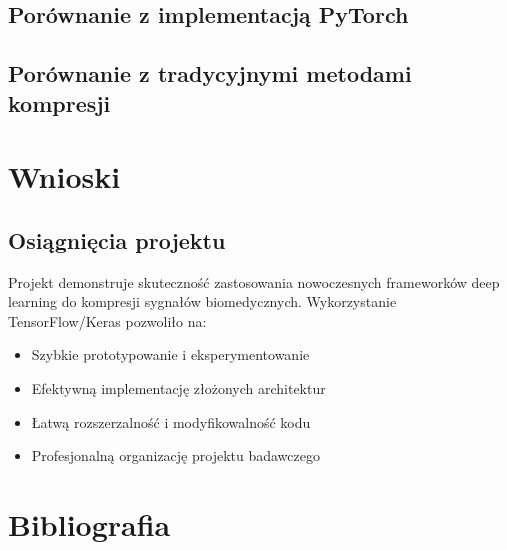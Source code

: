 \documentclass[12pt,a4paper]{article}
\begin{document}
\subsection{Porównanie z implementacją PyTorch}


\subsection{Porównanie z tradycyjnymi metodami kompresji}


\section{Wnioski}

\subsection{Osiągnięcia projektu}

Projekt demonstruje skuteczność zastosowania nowoczesnych frameworków deep learning do kompresji sygnałów biomedycznych. Wykorzystanie TensorFlow/Keras pozwoliło na:

\begin{itemize}
    \item Szybkie prototypowanie i eksperymentowanie
    \item Efektywną implementację złożonych architektur
    \item Łatwą rozszerzalność i modyfikowalność kodu
    \item Profesjonalną organizację projektu badawczego
\end{itemize}

\section{Bibliografia}

\begin{thebibliography}{9}

\end{thebibliography}
\end{document}
